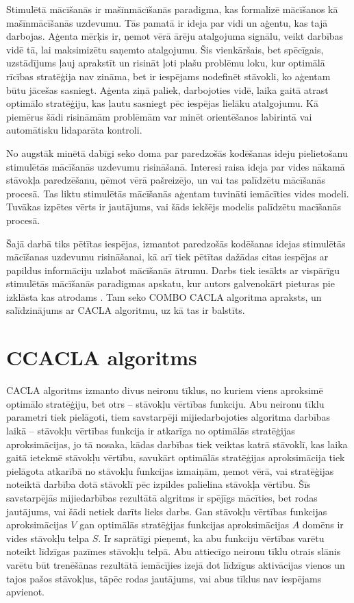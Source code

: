 \documentclass{ludis} %
\begin{document}
Stimulētā mācīšanās ir mašīnmācīšanās paradigma, kas formalizē mācīšanos kā
mašīnmācīšanās uzdevumu. Tās pamatā ir ideja par vidi un aģentu, kas tajā
darbojas. Aģenta mērķis ir, ņemot vērā ārēju atalgojuma signālu, veikt darbības
vidē tā, lai maksimizētu saņemto atalgojumu. Šis vienkāršais, bet spēcīgais,
uzstādījums ļauj aprakstīt un risināt ļoti plašu problēmu loku, kur optimālā
rīcības stratēģija nav zināma, bet ir iespējams nodefinēt stāvokli, ko aģentam
būtu jācešas sasniegt. Aģenta ziņā paliek, darbojoties vidē, laika gaitā atrast
optimālo stratēģiju, kas ļautu sasniegt pēc iespējas lielāku atalgojumu. Kā
piemērus šādi risināmām problēmām var minēt orientēšanos labirintā vai
automātisku lidaparāta kontroli.

No augstāk minētā dabīgi seko doma par paredzošās kodēšanas ideju pielietošanu
stimulētās mācīšanās uzdevumu risināšanā. Interesi raisa ideja par vides nākamā
stāvokļa paredzēšanu, ņēmot vērā pašreizējo, un vai tas palīdzētu mācīšanās
procesā. Tas liktu stimulētās mācīšanās aģentam tuvināti iemācīties vides
modeli. Tuvākas izpētes vērts ir jautājums, vai šāds iekšējs modelis palīdzētu
macīšanās procesā.

Šajā darbā tiks pētītas iespējas, izmantot paredzošās kodēšanas idejas stimulētās
mācīšanas uzdevumu risināšanai, kā arī tiek pētītas dažādas citas iespējas ar
papildus informāciju uzlabot mācīšanās ātrumu. Darbs tiek iesākts ar vispārīgu stimulētās
mācīšanās paradigmas apskatu, kur autors galvenokārt pieturas pie izklāsta kas
atrodams \autocite{Krislauks2015}. Tam seko COMBO CACLA algoritma apraksts, un
salīdzinājums ar CACLA algoritmu, uz kā tas ir balstīts. %
\chapter{CCACLA algoritms}\label{chap:ccacla}
CACLA algoritms izmanto divus neironu tīklus, no kuriem viens aproksimē optimālo
stratēģiju, bet otrs -- stāvokļu vērtības funkciju. Abu neironu tīklu parametri
tiek pielāgoti, tiem savstarpēji mijiedarbojoties algoritma darbības laikā --
stāvokļu vērtības funkcija ir atkarīga no optimālās stratēģijas aproksimācijas,
jo tā nosaka, kādas darbības tiek veiktas katrā stāvoklī, kas laika gaitā
ietekmē stāvokļu vērtību, savukārt optimālās stratēģijas aproksimācija tiek
pielāgota atkarībā no stāvokļu funkcijas izmaiņām, ņemot vērā, vai stratēģijas
noteiktā darbība dotā stāvoklī pēc izpildes palielina stāvokļa vērtību. Šīs
savstarpējās mijiedarbības rezultātā algritms ir spējīgs mācīties, bet rodas
jautājums, vai šādi netiek darīts lieks darbs. Gan stāvokļu vērtības funkcijas
aproksimācijas $V$ gan optimālās stratēģijas funkcijas aproksimācijas $A$ domēns
ir vides stāvokļu telpa $S$. Ir saprātīgi pieņemt, ka abu funkciju vērtības
varētu noteikt līdzīgas pazīmes stāvokļu telpā. Abu attiecīgo neironu tīklu
otrais slānis varētu būt trenēšānas rezultātā iemācījies izejā dot līdzīgus
aktivācijas vienos un tajos pašos stāvokļus, tāpēc rodas jautājums, vai abus
tīklus nav iespējams apvienot.
\end{document}
